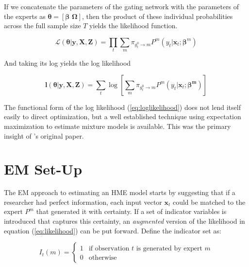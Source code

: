 \documentclass[12pt]{article}
\newcommand{\gateprod}[2]{\pi_{#1 \longrightarrow #2}}
\theoremstyle{definition}
\begin{document}
\bigskip

If we concatenate the parameters of the gating network with the parameters
of the experts as $\boldsymbol{\theta} = [\boldsymbol{\beta} \,\, \boldsymbol{\Omega}]$,
then the product of these individual probabilities across the full sample size $T$ yields
the likelihood function. 

\begin{equation} \label{eq:likelihood}
  \mathcal{L}(\boldsymbol{\theta}| \boldsymbol{y}, \boldsymbol{X}, \boldsymbol{Z}) = \prod_{t}  \sum_{m} \gateprod{g^{0}_{t}}{m}  P^{m}(y_{t}| \boldsymbol{x}_{t}; \boldsymbol{\beta}^{m})
\end{equation}

And taking its log yields the log likelihood

\begin{equation} \label{eq:loglikelihood}
  \boldsymbol{l}(\boldsymbol{\theta}| \boldsymbol{y}, \boldsymbol{X}, \boldsymbol{Z}) = \sum_{t} \log \left[ \sum_{m} \gateprod{g^{0}_{t}}{m} P^{m}(y_{t}| \boldsymbol{x}_{t}; \boldsymbol{\beta^{m}}) \right]
\end{equation}

The functional form of the log likelihood (\ref{eq:loglikelihood}) does not
lend itself easily to direct optimization, but a well established
technique using expectation maximization \citep{EM_DLR1977} to estimate mixture
models is available. This was the primary insight of \citet{JordanJacobs1993}'s
original paper.


\section{EM Set-Up} \label{sec:Estimation}

The EM approach to estimating an HME model starts by suggesting that if a
researcher had perfect information, each input vector $\boldsymbol{x}_{t}$ could be matched
to the expert $P^{m}$ that generated it with certainty. If a set of indicator
variables is introduced that captures this certainty, an \textit{augmented}
version of the likelihood in equation (\ref{eq:likelihood}) can be put forward.
Define the indicator set as:

\begin{equation} \label{eq:indicator}
  I_{t}(m) = \begin{cases} 
     1 & \textrm{if observation $t$ is generated by expert $m$} \\
     0 & \textrm{otherwise}
             \end{cases}
\end{equation}
\end{document}
